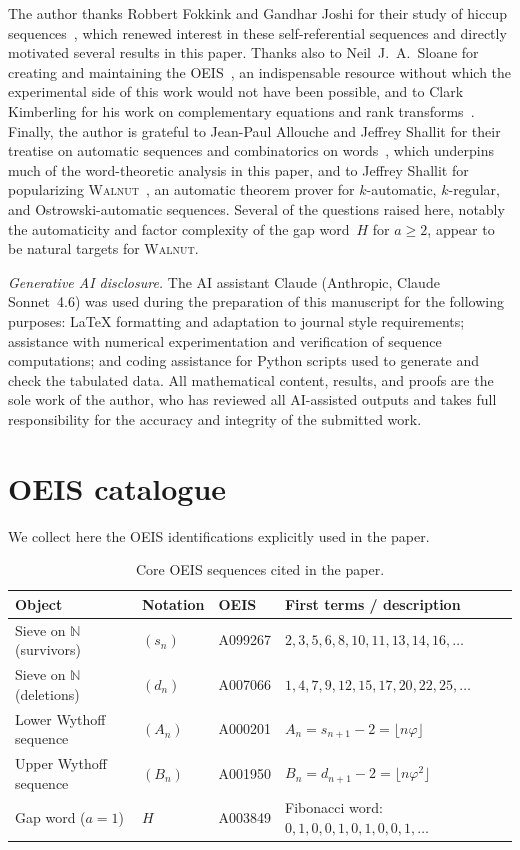 \documentclass[11pt]{article}
\numberwithin{equation}{section}
\theoremstyle{plain}
\theoremstyle{definition}
\theoremstyle{remark}
\newcommand{\N}{\mathbb{N}}
\begin{document}
The author thanks Robbert Fokkink and Gandhar Joshi for their
study of hiccup sequences~\cite{FJ2026}, which renewed
interest in these self-referential sequences and directly motivated
several results in this paper.  Thanks also to Neil~J.~A.~Sloane for
creating and maintaining the OEIS~\cite{OEIS}, an indispensable
resource without which the experimental side of this work would not
have been possible, and to Clark Kimberling for his work
on complementary equations and rank
transforms~\cite{Kimberling1993,Kimberling2007,Kimberling2008}.
Finally, the author is grateful to Jean-Paul Allouche and Jeffrey
Shallit for their treatise on automatic sequences and
combinatorics on words~\cite{AS2003}, which underpins much of the
word-theoretic analysis in this paper, and to Jeffrey Shallit
for popularizing \textsc{Walnut}~\cite{Shallit2022walnut}, an
automatic theorem prover for $k$-automatic, $k$-regular, and
Ostrowski-automatic sequences.
Several of the questions raised here, notably the automaticity and
factor complexity of the gap word~$H$ for $a\ge2$, appear to be
natural targets for \textsc{Walnut}.

\medskip
\noindent\textit{Generative AI disclosure.}
The AI assistant Claude (Anthropic, Claude Sonnet~4.6) was used
during the preparation of this manuscript for the following purposes:
LaTeX formatting and adaptation to journal style requirements;
assistance with numerical experimentation and verification of
sequence computations; and coding assistance for Python scripts
used to generate and check the tabulated data.
All mathematical content, results, and proofs are the sole work
of the author, who has reviewed all AI-assisted outputs and takes
full responsibility for the accuracy and integrity of the
submitted work.

\appendix

\section{OEIS catalogue}\label{sec:oeis}

We collect here the OEIS identifications explicitly used in the paper.

\begin{table}[ht]
\centering
\begin{tabular}{@{}lllp{}@{}}
\toprule
Object & Notation & OEIS & First terms / description \\ \midrule
Sieve on $\N$ (survivors) & $(s_n)$ & A099267 &
  $2,3,5,6,8,10,11,13,14,16,\ldots$ \\
Sieve on $\N$ (deletions) & $(d_n)$ & A007066 &
  $1,4,7,9,12,15,17,20,22,25,\ldots$ \\
Lower Wythoff sequence & $(A_n)$ & A000201 &
  $A_n=s_{n+1}-2=\lfloor n\varphi\rfloor$ \\
Upper Wythoff sequence & $(B_n)$ & A001950 &
  $B_n=d_{n+1}-2=\lfloor n\varphi^2\rfloor$ \\
Gap word ($a=1$) & $H$ & A003849 &
  Fibonacci word: $0,1,0,0,1,0,1,0,0,1,\ldots$ \\
\bottomrule
\end{tabular}
\caption{Core OEIS sequences cited in the paper.}
\label{tab:oeis-core}
\end{table}
\end{document}
